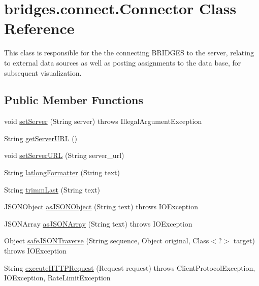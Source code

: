 \hypertarget{classbridges_1_1connect_1_1_connector}{}\section{bridges.\+connect.\+Connector Class Reference}
\label{classbridges_1_1connect_1_1_connector}


This class is responsible for the the connecting B\+R\+I\+D\+G\+ES to the server, relating to external data sources as well as posting assignments to the data base, for subsequent visualization.  


\subsection*{Public Member Functions}
\begin{DoxyCompactItemize}
\item 
void \mbox{\hyperlink{classbridges_1_1connect_1_1_connector_acab24a8c4ffd3349ec67536552fb30b3}{set\+Server}} (String server)  throws Illegal\+Argument\+Exception 
\item 
String \mbox{\hyperlink{classbridges_1_1connect_1_1_connector_a0b9809180aac96a83e31e224ab5ed6ec}{get\+Server\+U\+RL}} ()
\item 
void \mbox{\hyperlink{classbridges_1_1connect_1_1_connector_a71f449c91e529f79730df27e01fdf674}{set\+Server\+U\+RL}} (String server\+\_\+url)
\item 
String \mbox{\hyperlink{classbridges_1_1connect_1_1_connector_a2318cd93d18ef58285598f6f9cdf727b}{latlong\+Formatter}} (String text)
\item 
String \mbox{\hyperlink{classbridges_1_1connect_1_1_connector_ac0dca0bd99b6abbbd8a77874a95e6d49}{trimm\+Last}} (String text)
\item 
J\+S\+O\+N\+Object \mbox{\hyperlink{classbridges_1_1connect_1_1_connector_aac3fb75dd7975c4439cfd1bf6cefe0a6}{as\+J\+S\+O\+N\+Object}} (String text)  throws I\+O\+Exception 
\item 
J\+S\+O\+N\+Array \mbox{\hyperlink{classbridges_1_1connect_1_1_connector_aa5bd647713545fa24c6d730eacb6bc54}{as\+J\+S\+O\+N\+Array}} (String text)  throws I\+O\+Exception 
\item 
Object \mbox{\hyperlink{classbridges_1_1connect_1_1_connector_ab7d1d242fbf9acade316650e54a3d020}{safe\+J\+S\+O\+N\+Traverse}} (String sequence, Object original, Class$<$?$>$ target)  throws I\+O\+Exception 
\item 
String \mbox{\hyperlink{classbridges_1_1connect_1_1_connector_aabcfde23d155c8c42edb8a1407320bc5}{execute\+H\+T\+T\+P\+Request}} (Request request)  throws Client\+Protocol\+Exception, I\+O\+Exception, Rate\+Limit\+Exception 

\end{DoxyCompactItemize}
